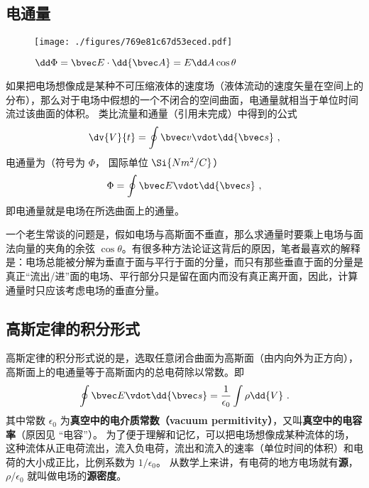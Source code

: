 \subsection{电通量}
\begin{figure}[ht]
\centering
\texttt{[image: ./figures/769e81c67d53eced.pdf]}
\caption{$\dd \Phi = \bvec E \cdot \dd {\bvec A} = E \dd A \cos \theta$} \label{fig_EGauss1}
\end{figure}
如果把电场想像成是某种不可压缩液体的速度场（液体流动的速度矢量在空间上的分布），那么对于电场中假想的一个不闭合的空间曲面，电通量就相当于单位时间流过该曲面的体积。
类比流量和通量（引用未完成）中得到的公式
\begin{equation}
\dv{V}{t} = \oint \bvec v \vdot \dd{\bvec s}~,
\end{equation} 
电通量为（符号为 $\Phi $， 国际单位 $\Si{N m^2/C}$）
\begin{equation}
\Phi  = \oint \bvec E \vdot \dd{\bvec s}~,
\end{equation} 
即电通量就是电场在所选曲面上的通量。

一个老生常谈的问题是，假如电场与高斯面不垂直，那么求通量时要乘上电场与面法向量的夹角的余弦 $\cos \theta$。有很多种方法论证这背后的原因，笔者最喜欢的解释是：电场总能被分解为垂直于面与平行于面的分量，而只有那些垂直于面的分量是真正“流出/进”面的电场、平行部分只是留在面内而没有真正离开面，因此，计算通量时只应该考虑电场的垂直分量。

\subsection{高斯定律的积分形式}

高斯定律的积分形式说的是，选取任意闭合曲面为高斯面（由内向外为正方向），高斯面上的电通量等于高斯面内的总电荷除以常数。即
\begin{equation}\label{eq_EGauss_5}
\oint \bvec E \vdot \dd{\bvec s}  = \frac{1}{\epsilon_0} \int \rho \dd{V}~.
\end{equation} 
其中常数 $\epsilon_0$ 为\textbf{真空中的电介质常数（vacuum permitivity）}，又叫\textbf{真空中的电容率}（原因见 “电容”）。 为了便于理解和记忆，可以把电场想像成某种流体的场，这种流体从正电荷流出，流入负电荷，流出和流入的速率（单位时间的体积）和电荷的大小成正比，比例系数为 $1/\epsilon_0$。 从数学上来讲，有电荷的地方电场就有\textbf{源}， $\rho /\epsilon_0$ 就叫做电场的\textbf{源密度}。

